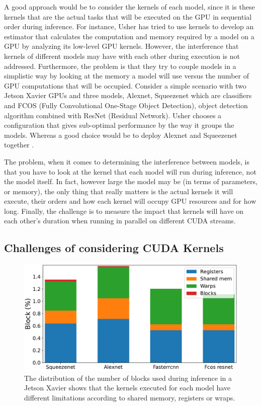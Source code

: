 A good approach would be to consider the kernels of each model, since it is these kernels that are the actual tasks that will be executed on the GPU in sequential order during inference. For instance, Usher has tried to use kernels to develop an estimator that calculates the computation and memory required by a model on a GPU by analyzing its low-level GPU kernels. However, the interference that kernels of different models may have with each other during execution is not addressed. Furthermore, the problem is that they try to couple models in a simplistic way by looking at the memory a model will use versus the number of GPU computations that will be occupied. Consider a simple scenario with two Jetson Xavier GPUs and three models, Alexnet, Squeezenet which are classifiers and FCOS (Fully Convolutional One-Stage Object Detection), object detection algorithm combined with ResNet (Residual Network). Usher chooses a configuration that gives sub-optimal performance by the way it groups the models. Whereas a good choice would be to deploy Alexnet and Squeezenet together .

The problem, when it comes to determining the interference between models, is that you have to look at the kernel that each model will run during inference, not the model itself. In fact, however large the model may be (in terms of parameters, or memory), the only thing that really matters is the actual kernels it will execute, their orders and how each kernel will occupy GPU resources and for how long. Finally, the challenge is to measure the impact that kernels will have on each other's duration when running in parallel on different CUDA streams.

\subsection{Challenges of considering CUDA Kernels}

\begin{figure}[t!]
	\centering
	\includegraphics[width=\linewidth]{chapters/roomie/images/launch__occupancy_limit_percentage_batch_size64.pdf}
	\caption{The distribution of the number of blocks used during inference in a Jetson Xavier shows that the kernels executed for each model have different limitations according to shared memory, registers or wraps.}
	\label{fig:occupancy_limit_percentage}
\end{figure}

